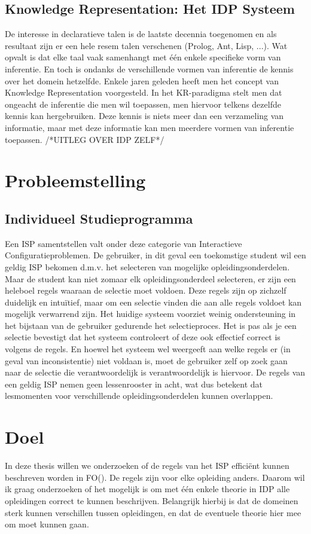 \subsection{Knowledge Representation: Het IDP Systeem}
De interesse in declaratieve talen is de laatste decennia toegenomen en als resultaat zijn er een hele resem talen verschenen (Prolog, Ant, Lisp, ...). Wat opvalt is dat elke taal vaak samenhangt met \'{e}\'{e}n enkele specifieke vorm van inferentie. En toch is ondanks de verschillende vormen van inferentie de kennis over het domein hetzelfde. Enkele jaren geleden heeft men het concept van Knowledge Representation \citep{denecker2008building} voorgesteld. In het KR-paradigma stelt men dat ongeacht de inferentie die men wil toepassen, men hiervoor telkens dezelfde kennis kan hergebruiken. Deze kennis is niets meer dan een verzameling van informatie, maar met deze informatie kan men meerdere vormen van inferentie toepassen. /*UITLEG OVER IDP ZELF*/

\section{Probleemstelling}

\subsection{Individueel Studieprogramma}
Een ISP samentstellen valt onder deze categorie van Interactieve Configuratieproblemen. De gebruiker, in dit geval een toekomstige student wil een geldig ISP bekomen d.m.v. het selecteren van mogelijke opleidingsonderdelen. Maar de student kan niet zomaar elk opleidingsonderdeel selecteren, er zijn een heleboel regels waaraan de selectie moet voldoen. Deze regels zijn op zichzelf duidelijk en intu\"{i}tief, maar om een selectie vinden die aan alle regels voldoet kan mogelijk verwarrend zijn. Het huidige systeem voorziet weinig ondersteuning in het bijstaan van de gebruiker gedurende het selectieproces. Het is pas als je een selectie bevestigt dat het systeem controleert of deze ook effectief correct is volgens de regels. En hoewel het systeem wel weergeeft aan welke regels er (in geval van inconsistentie) niet voldaan is, moet de gebruiker zelf op zoek gaan naar de selectie die verantwoordelijk is verantwoordelijk is hiervoor. De regels van een geldig ISP nemen geen lessenrooster in acht, wat dus betekent dat lesmomenten voor verschillende opleidingsonderdelen kunnen overlappen. 

\section{Doel}
In deze thesis willen we onderzoeken of de regels van het ISP effici\"{e}nt kunnen beschreven worden in FO(\textperiodcentered). De regels zijn voor elke opleiding anders. Daarom wil ik graag onderzoeken of het mogelijk is om met \'{e}\'{e}n enkele theorie in IDP alle opleidingen correct te kunnen beschrijven. Belangrijk hierbij is dat de domeinen sterk kunnen verschillen tussen opleidingen, en dat de eventuele theorie hier mee om moet kunnen gaan.

